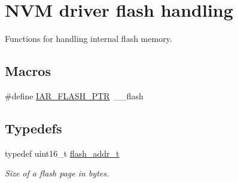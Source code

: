\hypertarget{group__nvm__flash__group}{\section{N\-V\-M driver flash handling}
\label{group__nvm__flash__group}
}


Functions for handling internal flash memory.  


\subsection*{Macros}
\begin{DoxyCompactItemize}
\item 
\#define \hyperlink{group__nvm__flash__group_ga1ff021ee17a7d4814fe900414e870c4f}{I\-A\-R\-\_\-\-F\-L\-A\-S\-H\-\_\-\-P\-T\-R}~\-\_\-\-\_\-flash
\end{DoxyCompactItemize}
\subsection*{Typedefs}
\begin{DoxyCompactItemize}
\item 
typedef uint16\-\_\-t \hyperlink{group__nvm__flash__group_ga95a069fc064dc9cd089b7d9047b909b0}{flash\-\_\-addr\-\_\-t}
\begin{DoxyCompactList}\small\item\em Size of a flash page in bytes. \end{DoxyCompactList}\end{DoxyCompactItemize}
